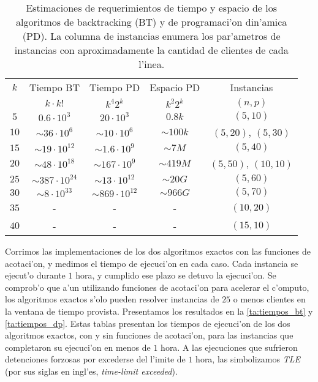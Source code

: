 \begin{table}[h]
\begin{center}
\begin{tabular}{|c|c|c|c|c|}
\hline
$k$ & Tiempo BT & Tiempo PD & Espacio PD & Instancias\\
 & $k \cdot k!$ & $k^4 2^k$ & $k^2 2^k$ & $(n, p)$\\
\hline
$5$ & $0.6 \cdot 10^3$ & $20 \cdot 10^3$ & $0.8k$ & $(5, 10)$\\
$10$ & $\sim 36 \cdot 10^6$ & $\sim 10 \cdot 10^6$ & $\sim 100k$ & $(5, 20)$, $(5, 30)$\\
$15$ & $\sim 19 \cdot 10^{12}$ & $\sim 1.6 \cdot 10^9$ & $\sim 7M$ & $(5, 40)$\\
$20$ & $\sim 48 \cdot 10^{18}$ & $\sim 167 \cdot 10^9$ & $\sim 419M$ & $(5, 50)$, $(10, 10)$\\
$25$ & $\sim 387 \cdot 10^{24}$ & $\sim 13 \cdot 10^{12}$ & $\sim 20G$ & $(5, 60)$\\
$30$ & $\sim 8 \cdot 10^{33}$ & $\sim 869 \cdot 10^{12}$ & $\sim 966G$ & $(5, 70)$\\
$35$ & - & - & - & $(10, 20)$\\
$40$ & - & - & - & $(15, 10)$\\
\hline
\end{tabular}
\end{center}
\caption{Estimaciones de requerimientos de tiempo y espacio de los algoritmos de backtracking (BT) y de programaci'on din'amica (PD). La columna de instancias enumera los par'ametros de instancias con aproximadamente la cantidad de clientes de cada l'inea.}
\label{ta:algoritmos_tiempo_espacio}
\end{table}

Corrimos las implementaciones de los dos algoritmos exactos con las funciones de acotaci'on, y medimos el tiempo de ejecuci'on en cada caso. Cada instancia se ejecut'o durante $1$ hora, y cumplido ese plazo se detuvo la ejecuci'on. Se comprob'o que a'un utilizando funciones de acotaci'on para acelerar el c'omputo, los algoritmos exactos s'olo pueden resolver instancias de $25$ o menos clientes en la ventana de tiempo provista. Presentamos los resultados en la \autoref{ta:tiempos_bt} y \autoref{ta:tiempos_dp}. Estas tablas presentan los tiempos de ejecuci'on de los dos algoritmos exactos, con y sin funciones de acotaci'on, para las instancias que completaron su ejecuci'on en menos de $1$ hora. A las ejecuciones que sufrieron detenciones forzosas por excederse del l'imite de $1$ hora, las simbolizamos \textit{TLE} (por sus siglas en ingl'es, \textit{time-limit exceeded}).

